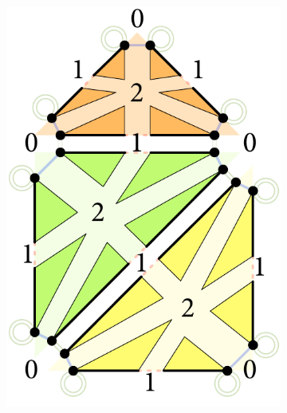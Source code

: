 \begin{figure}
\begin{subfigure}{0.33\linewidth}
\includegraphics[scale=0.7]{figs/2dcc-gmap}
\caption{}%
\label{subfig:2dcc-gmap}
\end{subfigure}\\
\begin{subfigure}{0.33\linewidth}

\end{subfigure}
\end{figure}
